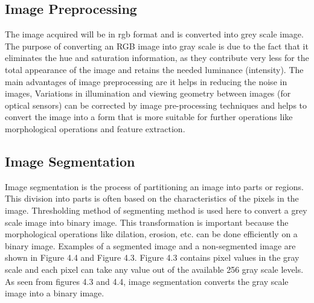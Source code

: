 \documentclass[journal]{IEEEtran}
\begin{document}
 \subsection{Image Preprocessing}
  The image acquired will be in rgb format and is converted into grey scale image. The purpose of converting an RGB image into gray scale is due to the fact that it eliminates the hue and saturation information, as they contribute very less for the total appearance of the image and retains the needed luminance (intensity).  The main advantages of image preprocessing are it helps in reducing the noise in images, Variations in illumination and viewing geometry between images (for optical sensors) can be corrected by image pre-processing techniques and helps to convert the image into a form that is more suitable for further
operations like morphological operations and feature extraction.

\subsection{Image Segmentation}
Image segmentation is the process of partitioning an image into parts or regions. This division into parts is often based on the characteristics of the pixels in the image. Thresholding method of segmenting method is used here to convert a grey scale image into binary image. This transformation is important because the morphological operations like dilation, erosion, etc. can be done efficiently on a binary image. Examples of a segmented image and a non-segmented image are shown in Figure 4.4 and Figure
4.3. Figure 4.3 contains pixel values in the gray scale and each pixel can take any value out of the available 256 gray scale levels. As seen from figures 4.3 and 4.4, image segmentation converts the gray scale image into a binary image. 
\end{document}
